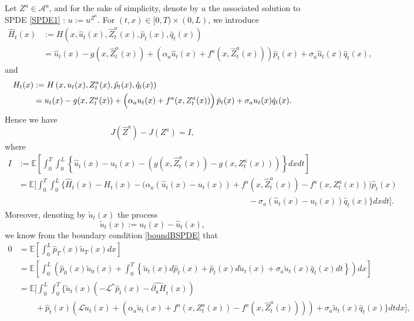 \documentclass[11pt]{article}
\begin{document}
Let $Z^a \in \mathcal A^a$, and for the sake of simplicity, denote by $u$ the associated solution to SPDE \eqref{SPDE1} : $u:= u^{Z^a}$. For $(t,x) \in [0,T) \times (0,L)$, we introduce
\begin{align*}
\hat H_t(x) &:= H\left(x, \hat u_t(x), \hat Z^a_t(x), \hat p_t(x), \hat q_t(x) \right)\\
&=\hat u_t(x) - g(x,\hat Z^a_t(x)) + \left(\alpha_a \hat u_t(x) +f^a(x,\hat Z^a_t(x))\right)\hat p_t(x) + \sigma_a \hat u_t(x) \hat q_t(x),
\end{align*}
and 
\begin{align*}
H_t(x) &:= H\left(x, u_t(x), Z^a_t(x), \hat p_t(x), \hat q_t(x) \right)\\
&= u_t(x) - g(x, Z^a_t(x)) + \left(\vphantom{\hat Z^a_t(x)}\alpha_a  u_t(x) +f^a(x,Z^a_t(x))\right)\hat p_t(x) + \sigma_a  u_t(x) \hat q_t(x).
\end{align*}
Hence we have 
$$J(\hat Z^a) - J(Z^a) = I,$$
where 
\begin{align*}
I&:= \mathbb E \left[ \int_0^T \int_0^L \left \{ \hat u_t(x) - u_t(x) -\left(g(x,\hat Z^a_t(x)) - g(x,Z^a_t(x)) \right)  \right\} dx dt \right]\\
&= \mathbb E\! \bigg[ \int_0^T\!\!\! \int_0^L\!\! \Big\{ \hat H_t(x)\! -\! H_t(x)\! -\!\big(\alpha_a (\hat u_t(x) - u_t(x)) + f^a(x,\hat Z^a_t(x))- f^a(x,Z^a_t(x)) \big) \hat p_t(x) \\
& \qquad \qquad \qquad \qquad \qquad \qquad \qquad \qquad \qquad \qquad \qquad \qquad \qquad \qquad   - \sigma_a (\hat u_t(x)\! -\! u_t(x))\hat q_t(x)  \Big\} dx dt \bigg].
\end{align*}
Moreover, denoting by $\tilde u_t(x)$ the process 
$$\tilde u_t(x) := u_t(x) - \hat u_t(x),$$
we know from the boundary condition \eqref{boundBSPDE} that 
\begin{align*}
0 &= \mathbb E\left[\int_0^L \hat p_T(x)\tilde u_T(x) dx   \right]\\
&= \mathbb E\left[\int_0^L \left( \hat p_0(x)\tilde u_0(x)  + \int_0^T \left\{ \tilde u_t(x) d\hat p_t(x) + \hat p_t(x) d\tilde u_t(x) +  \sigma_a \tilde u_t(x) \hat q_t(x) dt\right\}   \right) dx\right]\\
&= \mathbb E \Bigg[ \int_0^L \int_0^T \bigg\{ \tilde u_t(x) \left(- \mathcal L^* \hat p_t(x) - \widehat{\partial_u H}_t(x) \right)\\
& \qquad + \hat p_t(x) \left( \mathcal L \tilde u_t(x) +\left(\alpha_a \tilde u_t(x) +f^a(x,Z^a_t(x)) - f^a(x, \hat Z^a_t(x))\right) \right) + \sigma_a \tilde u_t(x) \hat q_t(x) \bigg\}dt dx \Bigg],
\end{align*}
\end{document}
